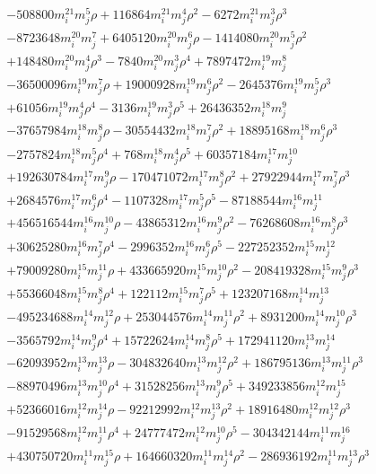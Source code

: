 {\begin{align*}
&-508800m_i^{21}m_j^{5}\rho+116864m_i^{21}m_j^{4}\rho^{2}-6272m_i^{21}m_j^{3}\rho^{3}\\
&-8723648m_i^{20}m_j^{7}+6405120m_i^{20}m_j^{6}\rho-1414080m_i^{20}m_j^{5}\rho^{2}\\
&+148480m_i^{20}m_j^{4}\rho^{3}-7840m_i^{20}m_j^{3}\rho^{4}+7897472m_i^{19}m_j^{8}\\
&-36500096m_i^{19}m_j^{7}\rho+19000928m_i^{19}m_j^{6}\rho^{2}-2645376m_i^{19}m_j^{5}\rho^{3}\\
&+61056m_i^{19}m_j^{4}\rho^{4}-3136m_i^{19}m_j^{3}\rho^{5}+26436352m_i^{18}m_j^{9}\\
&-37657984m_i^{18}m_j^{8}\rho-30554432m_i^{18}m_j^{7}\rho^{2}+18895168m_i^{18}m_j^{6}\rho^{3}\\
&-2757824m_i^{18}m_j^{5}\rho^{4}+768m_i^{18}m_j^{4}\rho^{5}+60357184m_i^{17}m_j^{10}\\
&+192630784m_i^{17}m_j^{9}\rho-170471072m_i^{17}m_j^{8}\rho^{2}+27922944m_i^{17}m_j^{7}\rho^{3}\\
&+2684576m_i^{17}m_j^{6}\rho^{4}-1107328m_i^{17}m_j^{5}\rho^{5}-87188544m_i^{16}m_j^{11}\\
&+456516544m_i^{16}m_j^{10}\rho-43865312m_i^{16}m_j^{9}\rho^{2}-76268608m_i^{16}m_j^{8}\rho^{3}\\
&+30625280m_i^{16}m_j^{7}\rho^{4}-2996352m_i^{16}m_j^{6}\rho^{5}-227252352m_i^{15}m_j^{12}\\
&+79009280m_i^{15}m_j^{11}\rho+433665920m_i^{15}m_j^{10}\rho^{2}-208419328m_i^{15}m_j^{9}\rho^{3}\\
&+55366048m_i^{15}m_j^{8}\rho^{4}+122112m_i^{15}m_j^{7}\rho^{5}+123207168m_i^{14}m_j^{13}\\
&-495234688m_i^{14}m_j^{12}\rho+253044576m_i^{14}m_j^{11}\rho^{2}+8931200m_i^{14}m_j^{10}\rho^{3}\\
&-3565792m_i^{14}m_j^{9}\rho^{4}+15722624m_i^{14}m_j^{8}\rho^{5}+172941120m_i^{13}m_j^{14}\\
&-62093952m_i^{13}m_j^{13}\rho-304832640m_i^{13}m_j^{12}\rho^{2}+186795136m_i^{13}m_j^{11}\rho^{3}\\
&-88970496m_i^{13}m_j^{10}\rho^{4}+31528256m_i^{13}m_j^{9}\rho^{5}+349233856m_i^{12}m_j^{15}\\
&+52366016m_i^{12}m_j^{14}\rho-92212992m_i^{12}m_j^{13}\rho^{2}+18916480m_i^{12}m_j^{12}\rho^{3}\\
&-91529568m_i^{12}m_j^{11}\rho^{4}+24777472m_i^{12}m_j^{10}\rho^{5}-304342144m_i^{11}m_j^{16}\\
&+430750720m_i^{11}m_j^{15}\rho+164660320m_i^{11}m_j^{14}\rho^{2}-286936192m_i^{11}m_j^{13}\rho^{3}\\

\end{align*}}
